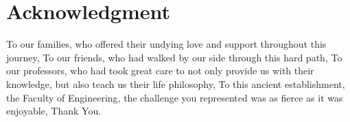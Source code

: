 \chapter*{Acknowledgment}


To our families, who offered their undying love and support throughout this journey, \newline
To our friends, who had walked by our side through this hard path, \newline
To our professors, who had took great care to not only provide us with their knowledge, but also teach us their life philosophy, \newline
To this ancient establishment, the Faculty of Engineering, the challenge you represented was as fierce as it was enjoyable, 
\vfill
{
\centering
Thank You.
}
\vfill